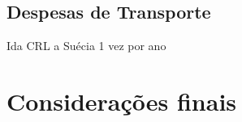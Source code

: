 \documentclass[
	12pt,				%
	openright,			%
	twoside,			%
	a4paper,			%
	english,			%
	french,				%
	spanish,			%
	brazil,				%
	]{abntex2}
\begin{document}
\section{Despesas de Transporte}
Ida CRL a Suécia 1 vez por ano

\lipsum[1-10]

\chapter*[Considerações finais]{Considerações finais}

\lipsum[31-33]

\postextual


\end{document}
